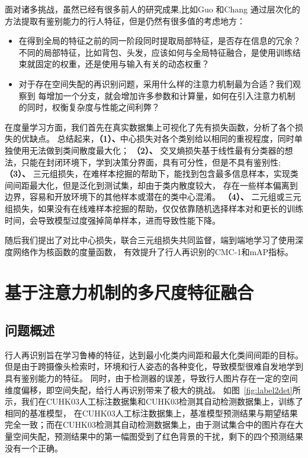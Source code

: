 面对诸多挑战，虽然已经有很多前人的研究成果,比如Guo \etal\cite{guo2018multilevel}和Chang \etal\cite{chang2018factor}通过层次化的方法提取有鉴别能力的行人特征，但是仍然有很多值的考虑地方：

\begin{itemize}
	\item \cite{zhao2017part} 在得到全局的特征之前的同一阶段同时提取局部特征，是否存在信息的冗余？
	不同的局部特征，比如背包、头发，应该如何与全局特征融合，是使用训练结束就固定的权重，还是使用与输入有关的动态权重？
	\item 对于存在空间失配的再识别问题，采用什么样的注意力机制最为合适？我们观察到\cite{zhao2017part} 每增加一个分支，就会增加许多参数和计算量，如何在引入注意力机制的同时，权衡复杂度与性能之间利弊？
\end{itemize}

在度量学习方面，我们首先在真实数据集上可视化了先有损失函数，分析了各个损失的优缺点。
总结起来，\textbf{（1）、}中心损失对各个类别给以相同的重视程度，同时单独使用无法做到类间散度最大化；
\textbf{（2）、}
交叉熵损失基于线性最有分类器的想法，只能在封闭环境下，学到决策分界面，具有可分性，但是不具有鉴别性;
\textbf{（3）、}
三元组损失，在难样本挖掘的帮助下，能找到包含最多信息样本，实现类间间距最大化，但是泛化到测试集，却由于类内散度较大，
存在一些样本偏离到边界，容易和开放环境下的其他样本或潜在的类中心混淆。
\textbf{（4）、}
二元组或三元组损失，如果没有在线难样本挖掘的帮助\cite{yaqing2016semantics}，仅仅依靠随机选择样本对和更长的训练时间，会导致模型过度强掉简单样本，进而导致性能下降。

随后我们提出了对比中心损失，联合三元组损失共同监督，端到端地学习了使用深度网络作为核函数的度量函数，
有效提升了行人再识别的CMC-1和mAP指标。

\chapter{基于注意力机制的多尺度特征融合}

\section{问题概述}

行人再识别旨在学习鲁棒的特征，达到最小化类内间距和最大化类间间距的目标。
但是由于跨摄像头检索时，环境和行人姿态的各种变化，导致模型很难自发地学到具有鉴别能力的特征。
同时，由于检测器的误差，导致行人图片存在一定的空间维度偏移，即空间失配，给行人再识别带来了极大的挑战。
如图~\ref{fig:label2det}所示，我们在CUHK03人工标注数据集和CUHK03检测其自动检测数据集上，训练了相同的基准模型，
在CUHK03人工标注数据集上，基准模型预测结果与期望结果完全一致；而在CUHK03检测其自动检测数据集上，由于测试集合中的图片存在大量空间失配，预测结果中的第一幅图受到了红色背景的干扰，剩下的四个预测结果没有一个正确。

